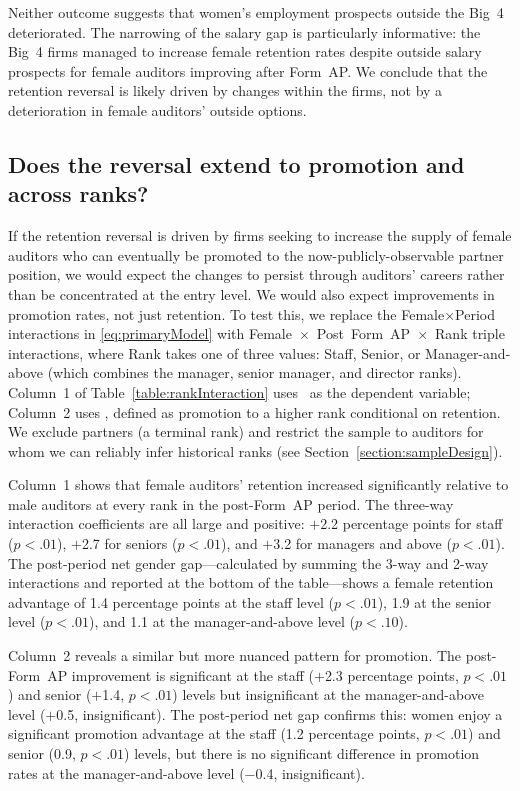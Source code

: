 \documentclass[11pt]{article}
\begin{document}
        Neither outcome suggests that women's employment prospects outside the Big~4 deteriorated. The narrowing of the salary gap is particularly informative: the Big~4 firms managed to increase female retention rates despite outside salary prospects for female auditors improving after Form~AP. We conclude that the retention reversal is likely driven by changes within the firms, not by a deterioration in female auditors' outside options.

    \subsection{Does the reversal extend to promotion and across ranks?}\label{section:rankPromotion}

        If the retention reversal is driven by firms seeking to increase the supply of female auditors who can eventually be promoted to the now-publicly-observable partner position, we would expect the changes to persist through auditors' careers rather than be concentrated at the entry level. We would also expect improvements in promotion rates, not just retention. To test this, we replace the Female$\times$Period interactions in \ref{eq:primaryModel} with Female~$\times$~Post~Form~AP~$\times$~Rank triple interactions, where Rank takes one of three values: Staff, Senior, or Manager-and-above (which combines the manager, senior manager, and director ranks). Column~1 of Table~\ref{table:rankInteraction} uses \RETAINED\ as the dependent variable; Column~2 uses \PROMOTED, defined as promotion to a higher rank conditional on retention. We exclude partners (a terminal rank) and restrict the sample to auditors for whom we can reliably infer historical ranks (see Section~\ref{section:sampleDesign}).

        Column~1 shows that female auditors' retention increased significantly relative to male auditors at every rank in the post-Form~AP period. The three-way interaction coefficients are all large and positive: $+$2.2 percentage points for staff ($p<.01$), $+$2.7 for seniors ($p<.01$), and $+$3.2 for managers and above ($p<.01$). The post-period net gender gap---calculated by summing the 3-way and 2-way interactions and reported at the bottom of the table---shows a female retention advantage of 1.4 percentage points at the staff level ($p<.01$), 1.9 at the senior level ($p<.01$), and 1.1 at the manager-and-above level ($p<.10$).

        Column~2 reveals a similar but more nuanced pattern for promotion. The post-Form~AP improvement is significant at the staff ($+$2.3 percentage points, $p<.01$) and senior ($+$1.4, $p<.01$) levels but insignificant at the manager-and-above level ($+$0.5, insignificant). The post-period net gap confirms this: women enjoy a significant promotion advantage at the staff (1.2 percentage points, $p<.01$) and senior (0.9, $p<.01$) levels, but there is no significant difference in promotion rates at the manager-and-above level ($-$0.4, insignificant).
\end{document}
